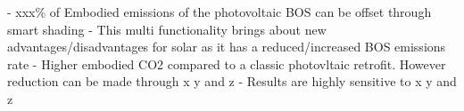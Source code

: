 
- xxx\% of Embodied emissions of the photovoltaic BOS can be offset through smart shading
- This multi functionality brings about new advantages/disadvantages for solar as it has a reduced/increased BOS emissions rate
- Higher embodied CO2 compared to a classic photovltaic retrofit. However reduction can be made through x y and z
- Results are highly sensitive to x y and z
